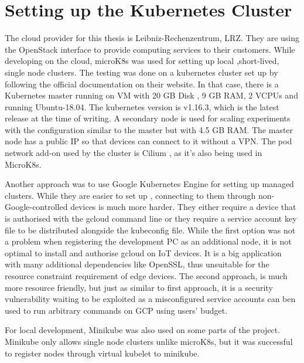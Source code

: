 \section{Setting up the Kubernetes Cluster}
The cloud provider for this thesis is Leibniz-Rechenzentrum, LRZ. They are using the OpenStack \cite{openstack} interface to provide computing services to their customers. While developing on the cloud, microK8s was used for setting up local ,short-lived, single node clusters. The testing was done on a kubernetes cluster set up by following the official documentation on their website. In that case, there is a Kubernetes master running on VM with 20 GB Disk , 9 GB RAM, 2 VCPUs and running Ubuntu-18.04. The kubernetes version is v1.16.3, which is the latest release at the time of writing. A secondary node is used for scaling experiments with the configuration similar to the master but with 4.5 GB RAM. The master node has a public IP so that devices can connect to it without a VPN. The pod network add-on used by the cluster is Cilium \cite{cilium}, as it's also being used in MicroK8s.

Another approach was to use Google Kubernetes Engine for setting up managed clusters. While they are easier to set up , connecting to them through non-Google-controlled devices is much more harder. They either require a device that is authorised with the gcloud command line or they require a service account key file to be distributed alongside the kubeconfig file. While the first option was not a problem when registering the development PC as an additional node, it is not optimal to install and authorise gcloud on IoT devices. It is a big application with many additional dependencies like OpenSSL, thus unsuitable for the resource constraint requirement of edge devices. The second approach, is much more resource friendly, but just as similar to first approach, it is a security vulnerability waiting to be exploited as a misconfigured service accounts can ben used to run arbitrary commands on GCP using users' budget.

For local development, Minikube was also used on some parts of the project. Minikube only allows single node clusters unlike microK8s, but it was successful to register nodes through virtual kubelet to minikube.
